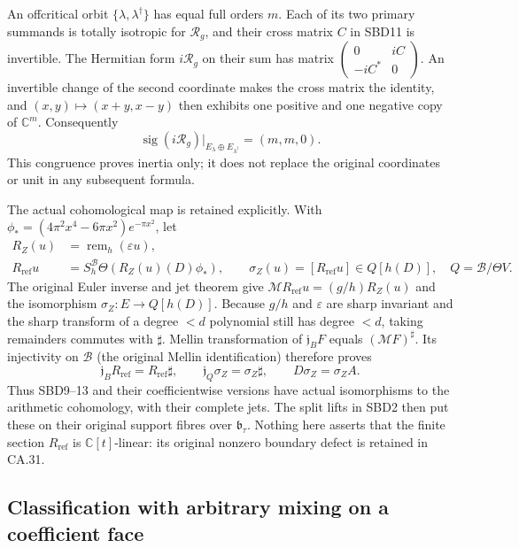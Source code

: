 An offcritical orbit $\{\lambda,\lambda^\dagger\}$ has
equal full orders $m$. Each of its two primary summands is
totally isotropic for $\mathcal R_g$, and their cross matrix
$C$ in SBD11 is invertible. The Hermitian form $i\mathcal R_g$
on their sum has matrix
$\left(\begin{smallmatrix}0&iC\\-iC^*&0\end{smallmatrix}\right)$.
An invertible change of the second coordinate makes the cross
matrix the identity, and $(x,y)\mapsto(x+y,x-y)$ then exhibits
one positive and one negative copy of $\mathbb C^m$.
Consequently
\[
 \operatorname{sig}(i\mathcal R_g)|_{E_\lambda\oplus E_{\lambda^\dagger}}
       =(m,m,0).
 \tag{SBD13}
\]
This congruence proves inertia only; it does not replace the
original coordinates or unit in any subsequent formula.

The actual cohomological map is retained explicitly. With
$\phi_*=(4\pi^2x^4-6\pi x^2)e^{-\pi x^2}$, let
\[
 \begin{split}
 R_Z(u)&=\operatorname{rem}_h(\varepsilon u),\\
 R_{\mathrm{ref}}u&=S_h^{\mathscr B}\Theta(R_Z(u)(D)\phi_*),\qquad
 \sigma_Z(u)=[R_{\mathrm{ref}}u]\in Q[h(D)],\quad Q=\mathscr B/\Theta V.
 \end{split}
 \tag{SBD14}
\]
The original Euler inverse and jet theorem give
$\mathcal M R_{\mathrm{ref}}u=(g/h)R_Z(u)$ and the isomorphism
$\sigma_Z:E\to Q[h(D)]$. Because $g/h$ and $\varepsilon$
are sharp invariant and the sharp transform of a degree $<d$
polynomial still has degree $<d$, taking remainders commutes
with $\sharp$. Mellin transformation of $\mathfrak j_BF$
equals $(\mathcal MF)^\sharp$. Its injectivity on $\mathscr B$
(the original Mellin identification) therefore proves
\[
 \mathfrak j_B R_{\mathrm{ref}}=R_{\mathrm{ref}}\sharp,
 \qquad \mathfrak j_Q\sigma_Z=\sigma_Z\sharp,
 \qquad D\sigma_Z=\sigma_Z A.
 \tag{SBD15}
\]
Thus SBD9--13 and their coefficientwise versions have actual
isomorphisms to the arithmetic cohomology, with their complete
jets. The split lifts in SBD2 then put these on their original
support fibres over $\mathfrak b_\tau$. Nothing here asserts
that the finite section $R_{\mathrm{ref}}$ is $\mathbb C[t]$-linear:
its original nonzero boundary defect is retained in CA.31.

\subsection{Classification with arbitrary mixing on a coefficient face}

